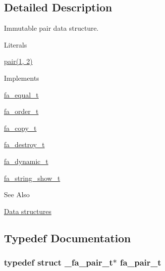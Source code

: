 \subsection{Detailed Description}
Immutable pair data structure. \begin{DoxyParagraph}{Literals}

\begin{DoxyItemize}
\item {\ttfamily \hyperlink{util_8h_a40ed40659d2ed7f8712b0fe6ba6edebe}{pair(1, 2)}}
\end{DoxyItemize}
\end{DoxyParagraph}
\begin{DoxyParagraph}{Implements }

\begin{DoxyItemize}
\item \hyperlink{structfa__equal__t}{fa\-\_\-equal\-\_\-t}
\item \hyperlink{structfa__order__t}{fa\-\_\-order\-\_\-t}
\item \hyperlink{structfa__copy__t}{fa\-\_\-copy\-\_\-t}
\item \hyperlink{structfa__destroy__t}{fa\-\_\-destroy\-\_\-t}
\item \hyperlink{structfa__dynamic__t}{fa\-\_\-dynamic\-\_\-t}
\item \hyperlink{structfa__string__show__t}{fa\-\_\-string\-\_\-show\-\_\-t}
\end{DoxyItemize}
\end{DoxyParagraph}
\begin{DoxySeeAlso}{See Also}

\begin{DoxyItemize}
\item \hyperlink{md__data_structures_DataStructures}{Data structures} 
\end{DoxyItemize}
\end{DoxySeeAlso}


\subsection{Typedef Documentation}
\hypertarget{group___fa_pair_gac2b2e58c230bac4f8a63ef6c05072680}{
\subsubsection[{fa\-\_\-pair\-\_\-t}]{\setlength{\rightskip}{0pt plus 5cm}typedef struct \-\_\-fa\-\_\-pair\-\_\-t$\ast$ {\bf fa\-\_\-pair\-\_\-t}}}\label{group___fa_pair_gac2b2e58c230bac4f8a63ef6c05072680}


